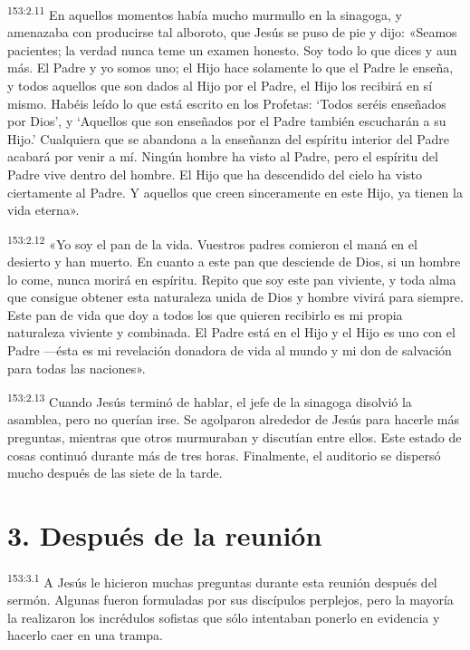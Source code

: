 \par 
\textsuperscript{153:2.11} En aquellos momentos había mucho murmullo en la sinagoga, y amenazaba con producirse tal alboroto, que Jesús se puso de pie y dijo: «Seamos pacientes; la verdad nunca teme un examen honesto. Soy todo lo que dices y aun más. El Padre y yo somos uno; el Hijo hace solamente lo que el Padre le enseña, y todos aquellos que son dados al Hijo por el Padre, el Hijo los recibirá en sí mismo. Habéis leído lo que está escrito en los Profetas: `Todos seréis enseñados por Dios', y `Aquellos que son enseñados por el Padre también escucharán a su Hijo.' Cualquiera que se abandona a la enseñanza del espíritu interior del Padre acabará por venir a mí. Ningún hombre ha visto al Padre, pero el espíritu del Padre vive dentro del hombre. El Hijo que ha descendido del cielo ha visto ciertamente al Padre. Y aquellos que creen sinceramente en este Hijo, ya tienen la vida eterna».

\par 
\textsuperscript{153:2.12} «Yo soy el pan de la vida. Vuestros padres comieron el maná en el desierto y han muerto. En cuanto a este pan que desciende de Dios, si un hombre lo come, nunca morirá en espíritu. Repito que soy este pan viviente, y toda alma que consigue obtener esta naturaleza unida de Dios y hombre vivirá para siempre. Este pan de vida que doy a todos los que quieren recibirlo es mi propia naturaleza viviente y combinada. El Padre está en el Hijo y el Hijo es uno con el Padre ---ésta es mi revelación donadora de vida al mundo y mi don de salvación para todas las naciones».

\par 
\textsuperscript{153:2.13} Cuando Jesús terminó de hablar, el jefe de la sinagoga disolvió la asamblea, pero no querían irse. Se agolparon alrededor de Jesús para hacerle más preguntas, mientras que otros murmuraban y discutían entre ellos. Este estado de cosas continuó durante más de tres horas. Finalmente, el auditorio se dispersó mucho después de las siete de la tarde.

\section*{3. Después de la reunión}
\par 
\textsuperscript{153:3.1} A Jesús le hicieron muchas preguntas durante esta reunión después del sermón. Algunas fueron formuladas por sus discípulos perplejos, pero la mayoría la realizaron los incrédulos sofistas que sólo intentaban ponerlo en evidencia y hacerlo caer en una trampa.


